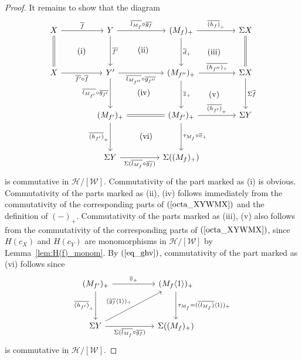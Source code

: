 \documentclass[a4paper,reqno,10pt]{amsart}
\DeclareRobustCommand{\darkblueedit}[1]{#1}
\theoremstyle{definition}
\theoremstyle{definition}
\theoremstyle{definition}
\theoremstyle{definition}
\theoremstyle{plain}
\newcommand{\CH}{\mathcal{H}}
\newcommand{\CW}{\mathcal{W}}
\begin{document}
\begin{proof}
It remains to show that the diagram
\[
\begin{tikzcd}[row sep=1.2cm, column sep=1.4cm]
{}
X
\arrow{r}{\overline{f}}
\arrow[equal]{d}
&Y
\arrow{r}{\overline{l_{M_f}}\circ\overline{g_f}}
\arrow{d}{\overline{f'}} 
&
(M_f)_+
\arrow{r}{\overline{(h_f)}_+}
\arrow{d}{\overline{d}_+}
&
\Sigma X \arrow[equal]{d}
\\
X
\arrow{r}[swap]{\overline{f'}\circ\overline{f}}
&
Y' 
\arrow{r}[swap]{\overline{l_{M_{f^{\prime\prime}}}}\circ\overline{g_{{f^{\prime\prime}}}}}
\arrow{d}[swap]{\overline{l_{M_{f'}}}\circ\overline{g_{f'}}} 
&(M_{f^{\prime\prime}})_+
\arrow{r}{\overline{(h_{f^{\prime\prime}})_+}}
\arrow{d}{\overline{z}_+}
&\Sigma X
\arrow{d}{\Sigma\overline{f}}
\\
&(M_{f'})_+
\arrow[equal]{r}
\arrow{d}[swap]{\overline{(h_{f'})}_+}
&(M_{f'})_+
\arrow{r}{\overline{(h_{f'})}_+}
\arrow{d}{\tau_{M_f}\circ \overline{v}_+}
&\Sigma Y
\\
&\Sigma Y
\arrow[swap]{r}{\Sigma (\overline{l_{M_f}}\circ\overline{g_f})}
&\Sigma ((M_f)_+)
\arrow[from=1-1,to=2-2, phantom, "\mathrm{(i)}"{pos=.5}]
\arrow[from=1-2,to=2-3, phantom, "\mathrm{(ii)}"{pos=.5}]
\arrow[from=1-3,to=2-4, phantom, "\mathrm{(iii)}"{pos=.5}]
\arrow[from=2-2,to=3-3, phantom, "\mathrm{(iv)}"{pos=.5}]
\arrow[from=2-3,to=3-4, phantom, "\mathrm{(v)}"{pos=.5}]
\arrow[from=3-2,to=4-3, phantom, "\mathrm{(vi)}"{pos=.5}]
\end{tikzcd}
\]
is commutative in $\CH/[\CW]$. 
Commutativity of the part marked as {\rm (i)} is obvious. 
Commutativity of the parts marked as \darkblueedit{{\rm (ii), (iv)}} follows immediately from the commutativity of the corresponding parts of $(\ref{octa_XYWMX})$ and the definition of $(-)_+$.
Commutativity of the parts marked as \darkblueedit{{\rm (iii), (v)}} also follows from the commutativity of the corresponding parts of $(\ref{octa_XYWMX})$, since $H(c_X)$ and $H(c_Y)$ are monomorphisms in $\CH/[\CW]$ by Lemma~\ref{lem:H(f)_monom}.
By $(\ref{eq_ghv})$, commutativity of the part marked as {\rm (vi)} follows since
\[
\begin{tikzcd}[row sep=1.2cm, column sep=1.8cm]
(M_{f'})_+ \arrow[r, "\overline{v}_+"]
\arrow{d}[swap]{\overline{(h_{f'})}_+}
&(M_f\langle1\rangle)_+
\arrow{d}{\tau_{M_f}=(\overline{(l_{M_f})}\langle1\rangle)_+}
\\
\Sigma Y \arrow[r, swap, "\Sigma(\overline{l_{M_f}}\circ\overline{g_f})"]
&\Sigma ((M_f)_+)
\arrow[from=2-1,to=1-2, "(\overline{g_f}\langle1\rangle)_+"{pos=.5}]
\end{tikzcd}
\]
is commutative in $\CH/[\CW]$.
\normalcolor
\end{proof}
\end{document}
